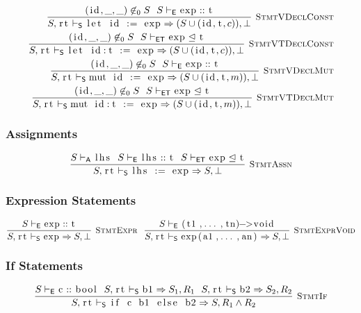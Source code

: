 \documentclass{article}
\newcommand{\code}[1]{\lstinline[columns=fixed]{#1}}
\newcommand{\drmrule}[5]{\frac{#1}{#2\vdash_{\mathsf{#3}}#4}\textsc{\ \small{#5}}}
\newcommand{\ruleapp}[1]{\vdash_{\mathsf{#1}}}
\newcommand{\mc}[1]{\textnormal{\code{#1}}}
\begin{document}
				\begin{align*}
					\drmrule{(\mc{id},\_,\_)\not\in_0 S\ \ S\ruleapp{E}\mc{exp} :: \mc{t}}{S,\mc{rt}}{S}{\mc{let id := exp} \Rightarrow (S \cup (\mc{id},\mc{t},c)),\bot}{StmtVDeclConst}\\
					\drmrule{(\mc{id},\_,\_)\not\in_0 S\ \ S\ruleapp{ET}\mc{exp}\trianglelefteq\mc{t}}{S,\mc{rt}}{S}{\mc{let id:t := exp} \Rightarrow (S \cup (\mc{id},\mc{t},c)),\bot}{StmtVTDeclConst}\\
					\drmrule{(\mc{id},\_,\_)\not\in_0 S\ \ S\ruleapp{E}\mc{exp} :: \mc{t}}{S,\mc{rt}}{S}{\mc{mut id := exp} \Rightarrow (S \cup (\mc{id},\mc{t},m)),\bot}{StmtVDeclMut}\\
					\drmrule{(\mc{id},\_,\_)\not\in_0 S\ \ S\ruleapp{ET}\mc{exp}\trianglelefteq\mc{t}}{S,\mc{rt}}{S}{\mc{mut id:t := exp} \Rightarrow (S \cup (\mc{id},\mc{t},m)),\bot}{StmtVTDeclMut}
				\end{align*}
			
			\subsubsection{Assignments}
			
				\begin{align*}
					\drmrule{S\ruleapp{A}\mc{lhs}\ \ S\ruleapp{E}\mc{lhs} :: \mc{t}\ \ S\ruleapp{ET}\mc{exp} \trianglelefteq \mc{t}}{S,\mc{rt}}{S}{\mc{lhs := exp} \Rightarrow S,\bot}{StmtAssn}
				\end{align*}
			
			\subsubsection{Expression Statements}
			
				\begin{align*}
					\drmrule{S\ruleapp{E}\mc{exp} :: \mc{t}}{S,\mc{rt}}{S}{\mc{exp} \Rightarrow S,\bot}{StmtExpr}\ \ \drmrule{S\ruleapp{E}\mc{(t1,...,tn)->void}}{S,\mc{rt}}{S}{\mc{exp(a1,...,an)} \Rightarrow S,\bot}{StmtExprVoid}
				\end{align*}
			
			\subsubsection{If Statements}
			
				\begin{align*}
					\drmrule{S\ruleapp{E}\mc{c} :: \mc{bool}\ \ S,\mc{rt}\ruleapp{S}\mc{b1}\Rightarrow S_1,R_1\ \ S,\mc{rt}\ruleapp{S}\mc{b2}\Rightarrow S_2,R_2}{S,\mc{rt}}{S}{\mc{if c b1 else b2} \Rightarrow S,R_1\wedge R_2}{StmtIf}
				\end{align*}
			
\end{document}
